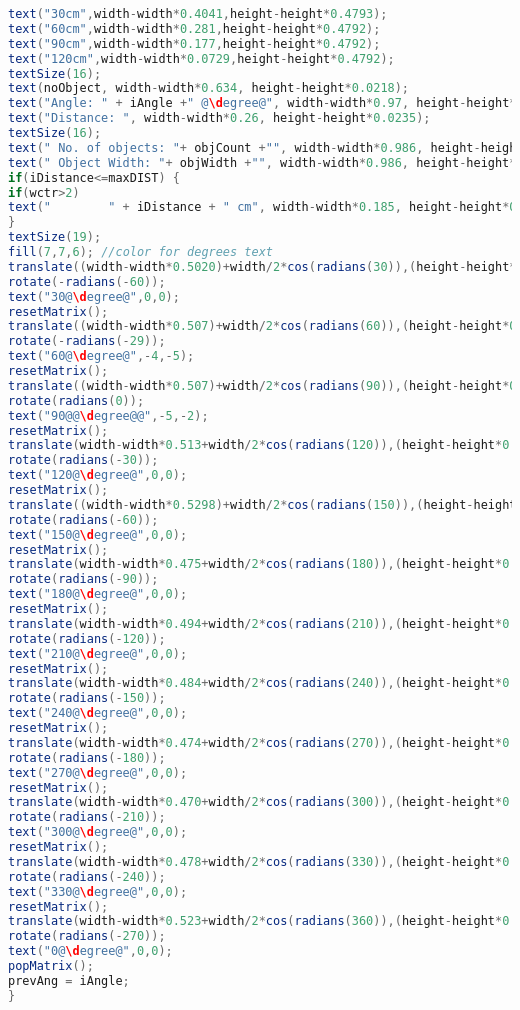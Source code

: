 \begin{mdframed}[backgroundcolor=light-gray, roundcorner=10pt,leftmargin=1, rightmargin=1, innerleftmargin=15, innertopmargin=15,innerbottommargin=15, outerlinewidth=1, linecolor=light-gray]
\begin{lstlisting}[caption={The Processing Code}, language=Java]
text("30cm",width-width*0.4041,height-height*0.4793);
text("60cm",width-width*0.281,height-height*0.4792);
text("90cm",width-width*0.177,height-height*0.4792);
text("120cm",width-width*0.0729,height-height*0.4792);
textSize(16);
text(noObject, width-width*0.634, height-height*0.0218);
text("Angle: " + iAngle +" @\degree@", width-width*0.97, height-height*0.0232);
text("Distance: ", width-width*0.26, height-height*0.0235);
textSize(16);
text(" No. of objects: "+ objCount +"", width-width*0.986, height-height*0.0714);
text(" Object Width: "+ objWidth +"", width-width*0.986, height-height*0.1714);
if(iDistance<=maxDIST) {
if(wctr>2)
text("        " + iDistance + " cm", width-width*0.185, height-height*0.0237);
}
textSize(19);
fill(7,7,6); //color for degrees text
translate((width-width*0.5020)+width/2*cos(radians(30)),(height-height*0.5283)-width/2*sin(radians(30)));
rotate(-radians(-60));
text("30@\degree@",0,0);
resetMatrix();
translate((width-width*0.507)+width/2*cos(radians(60)),(height-height*0.5139)-width/2*sin(radians(60)));
rotate(-radians(-29));
text("60@\degree@",-4,-5);
resetMatrix();
translate((width-width*0.507)+width/2*cos(radians(90)),(height-height*0.5149)-width/2*sin(radians(90)));
rotate(radians(0));
text("90@@\degree@@",-5,-2);
resetMatrix();
translate(width-width*0.513+width/2*cos(radians(120)),(height-height*0.51286)-width/2*sin(radians(120)));
rotate(radians(-30));
text("120@\degree@",0,0);
resetMatrix();
translate((width-width*0.5298)+width/2*cos(radians(150)),(height-height*0.4803)-width/2*sin(radians(150)));
rotate(radians(-60));
text("150@\degree@",0,0);
resetMatrix();
translate(width-width*0.475+width/2*cos(radians(180)),(height-height*0.47791)-width/2*sin(radians(180)));
rotate(radians(-90));
text("180@\degree@",0,0);
resetMatrix();
translate(width-width*0.494+width/2*cos(radians(210)),(height-height*0.4797)-width/2*sin(radians(210)));
rotate(radians(-120));
text("210@\degree@",0,0);
resetMatrix();
translate(width-width*0.484+width/2*cos(radians(240)),(height-height*0.4867)-width/2*sin(radians(240)));
rotate(radians(-150));
text("240@\degree@",0,0);
resetMatrix();
translate(width-width*0.474+width/2*cos(radians(270)),(height-height*0.50151)-width/2*sin(radians(270)));
rotate(radians(-180));
text("270@\degree@",0,0);
resetMatrix();
translate(width-width*0.470+width/2*cos(radians(300)),(height-height*0.51167)-width/2*sin(radians(300)));
rotate(radians(-210));
text("300@\degree@",0,0);
resetMatrix();
translate(width-width*0.478+width/2*cos(radians(330)),(height-height*0.5174)-width/2*sin(radians(330)));
rotate(radians(-240));
text("330@\degree@",0,0);
resetMatrix();
translate(width-width*0.523+width/2*cos(radians(360)),(height-height*0.52132)-width/2*sin(radians(360)));
rotate(radians(-270));
text("0@\degree@",0,0);
popMatrix(); 
prevAng = iAngle;
}
\end{lstlisting}
\end{mdframed}
\clearpage